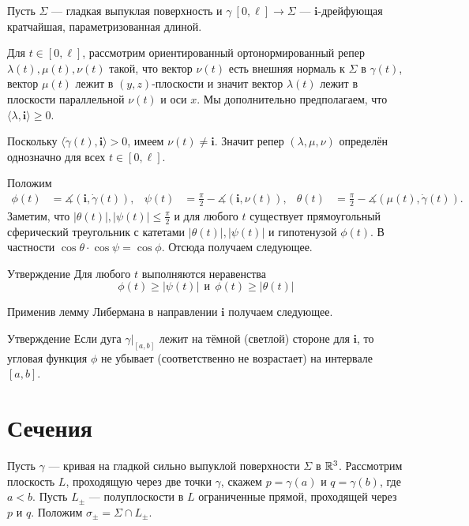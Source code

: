 \documentclass[a4paper,10pt]{article}
\begin{document}
Пусть $\Sigma$ --- гладкая выпуклая поверхность 
и $\gamma\:[0,\ell]\to \Sigma$ --- $\bm{i}$-дрейфующая кратчайшая, 
параметризованная длиной.

Для $t\in [0,\ell]$, 
рассмотрим ориентированный ортонормированный репер $\lambda(t),\mu(t),\nu(t)$ 
такой, что вектор $\nu(t)$ есть внешняя нормаль к $\Sigma$ в $\gamma(t)$,
вектор $\mu(t)$ лежит в $(y,z)$-плоскости 
и значит вектор $\lambda(t)$ лежит в плоскости параллельной $\nu(t)$ и оси $x$.
Мы дополнительно предполагаем, что $\langle\lambda,\bm{i}\rangle\ge 0$.

Поскольку $\langle\dot\gamma(t),\bm{i}\rangle>0$, имеем 
$\nu(t)\ne\bm{i}$. 
Значит репер $(\lambda,\mu,\nu)$ определён однозначно для всех $t\in[0,\ell]$.

Положим
\begin{align*}
\phi(t)&=\measuredangle(\bm{i},\dot\gamma(t)),&
\psi(t)&=\tfrac\pi2-\measuredangle(\bm{i},\nu(t)),&
\theta(t)&=\tfrac\pi2-\measuredangle(\mu(t),\dot\gamma(t)).
\end{align*}
Заметим, что $|\theta(t)|,|\psi(t)|\le \tfrac\pi2$ 
и для любого $t$ существует прямоугольный сферический треугольник с катетами $|\theta(t)|,|\psi(t)|$ и гипотенузой $\phi(t)$.
В частности $\cos\theta\cdot\cos\psi=\cos\phi$.
Отсюда получаем следующее.

\begin{thm}{Утверждение}\label{clm:alpha-phi-psi}
Для любого $t$ выполняются неравенства 
\[
\phi(t)\ge |\psi(t)|\ \ \text{и}\ \ \phi(t)\ge |\theta(t)|
\]

\end{thm}

Применив лемму Либермана в направлении $\bm{i}$ получаем следующее.

\begin{thm}{Утверждение}\label{clm:7.3}
Если дуга $\gamma|_{[a,b]}$ лежит на тёмной (светлой) стороне для $\bm{i}$, 
то угловая функция $\phi$ не убывает (соответственно не возрастает) на интервале $[a,b]$.
\end{thm}

\section{Сечения}

Пусть $\gamma$ --- кривая на гладкой сильно выпуклой поверхности $\Sigma$ в $\mathbb{R}^3$.
Рассмотрим плоскость $L$, 
проходящую через две точки $\gamma$, 
скажем $p=\gamma(a)$ и $q=\gamma(b)$, где $a<b$.
Пусть $L_\pm$ --- полуплоскости в $L$ ограниченные прямой, проходящей через $p$ и $q$.
Положим $\sigma_\pm=\Sigma\cap L_\pm$.
\end{document}
